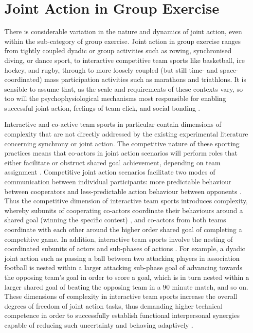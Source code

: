 \section{Joint Action in Group Exercise}
There is considerable variation in the nature and dynamics of joint action, even within the sub-category of group exercise. Joint action in group exercise ranges from tightly coupled dyadic or group activities such as rowing, synchronised diving, or dance sport, to interactive competitive team sports like basketball, ice hockey, and rugby, through to more loosely coupled (but still time- and space-coordinated) mass participation activities such as marathons and triathlons.  It is sensible to assume that, as the scale and requirements of these contexts vary, so too will the psychophysiological mechanisms most responsible for enabling successful joint action, feelings of team click, and social bonding \citep{Mogan2017,Launay2016}.

Interactive and co-active team sports in particular contain dimensions of complexity that are not directly addressed by the existing experimental literature concerning synchrony or joint action.  The competitive nature of these sporting practices means that co-actors in joint action scenarios will perform roles that either facilitate or obstruct shared goal achievement, depending on team assignment \citep{Renshaw2009}. Competitive joint action scenarios facilitate two modes of communication between individual participants: more predictable behaviour between cooperators and less-predictable action behaviour between opponents \citep{Glover2017}. Thus the competitive dimension of interactive team sports introduces complexity, whereby subunits of cooperating co-actors coordinate their behaviours around a shared goal (winning the specific contest) \citep{Passos2012},  and co-actors from both teams coordinate with each other around the higher order shared goal of completing a competitive game.
In addition, interactive team sports involve the nesting of coordinated subunits of actors and sub-phases of actions \citep{Vilar2012}.  For example, a dyadic joint action such as passing a ball between two attacking players in association football is nested within a larger attacking sub-phase goal of advancing towards the opposing team's goal in order to score a goal, which is in turn nested within a larger shared goal of beating the opposing team in a 90 minute match, and so on.  These dimensions of complexity in interactive team sports increase the overall degrees of freedom of joint action tasks, thus demanding higher technical competence in order to successfully establish functional interpersonal synergies capable of reducing such uncertainty and behaving adaptively \citep{Duarte2012}.

